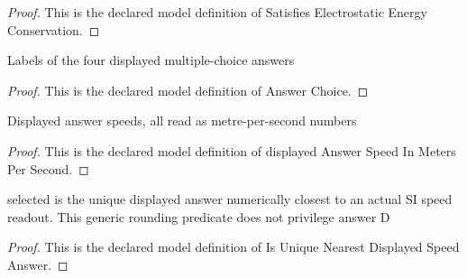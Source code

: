 \begin{proof}
  This is the declared model definition of Satisfies Electrostatic Energy Conservation.
\end{proof}
\begin{definition}
  \label{def:physics:phyx-mini-0865:phyxminiproblems-problemphyxmini0865-answerchoice}
  Labels of the four displayed multiple-choice answers
\end{definition}
\begin{proof}
  This is the declared model definition of Answer Choice.
\end{proof}
\begin{definition}
  \label{def:physics:phyx-mini-0865:phyxminiproblems-problemphyxmini0865-displayedanswerspeedinmeterspersecond}
  Displayed answer speeds, all read as metre-per-second numbers
\end{definition}
\begin{proof}
  This is the declared model definition of displayed Answer Speed In Meters Per Second.
\end{proof}
\begin{definition}
  \label{def:physics:phyx-mini-0865:phyxminiproblems-problemphyxmini0865-isuniquenearestdisplayedspeedanswer}
  selected is the unique displayed answer numerically closest to an actual SI speed readout. This generic rounding predicate does not privilege answer D
\end{definition}
\begin{proof}
  This is the declared model definition of Is Unique Nearest Displayed Speed Answer.
\end{proof}
